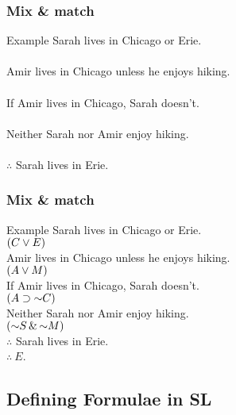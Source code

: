 \begin{frame}
  \frametitle{Mix \& match}
  \begin{block}{Example}
  Sarah lives in Chicago or Erie.\\
  \\
  Amir lives in Chicago unless he enjoys hiking.\\
  \\
  If Amir lives in Chicago, Sarah doesn't.\\
  \\
  Neither Sarah nor Amir enjoy hiking.\\
  \\
  $\therefore$ Sarah lives in Erie.
  \end{block}
\end{frame}

\begin{frame}
  \frametitle{Mix \& match}

  \begin{block}{Example}
  Sarah lives in Chicago or Erie.\\
  \alert{$(C \vee E)$}\\
  Amir lives in Chicago unless he enjoys hiking.\\
  \alert{$(A \vee M)$}\\
  If Amir lives in Chicago, Sarah doesn't.\\
  \alert{$(A \eif \enot C)$}\\
  Neither Sarah nor Amir enjoy hiking.\\
  \alert{$( \enot S \eand\enot M)$}\\
  $\therefore$ Sarah lives in Erie.\\
  \alert{$\therefore\ E$}.
  \end{block}
\end{frame}

\subsection{Defining Formulae in SL}


